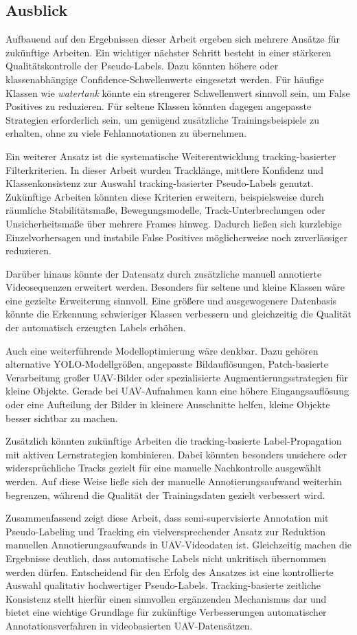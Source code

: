 \subsection{Ausblick}

Aufbauend auf den Ergebnissen dieser Arbeit ergeben sich mehrere Ansätze für
zukünftige Arbeiten. Ein wichtiger nächster Schritt besteht in einer stärkeren
Qualitätskontrolle der Pseudo-Labels. Dazu könnten höhere oder klassenabhängige
Confidence-Schwellenwerte eingesetzt werden. Für häufige Klassen wie
\textit{watertank} könnte ein strengerer Schwellenwert sinnvoll sein, um False
Positives zu reduzieren. Für seltene Klassen könnten dagegen angepasste Strategien
erforderlich sein, um genügend zusätzliche Trainingsbeispiele zu erhalten, ohne zu
viele Fehlannotationen zu übernehmen.

Ein weiterer Ansatz ist die systematische Weiterentwicklung tracking-basierter
Filterkriterien. In dieser Arbeit wurden Tracklänge, mittlere Konfidenz und
Klassenkonsistenz zur Auswahl tracking-basierter Pseudo-Labels genutzt. Zukünftige
Arbeiten könnten diese Kriterien erweitern, beispielsweise durch räumliche
Stabilitätsmaße, Bewegungsmodelle, Track-Unterbrechungen oder Unsicherheitsmaße
über mehrere Frames hinweg. Dadurch ließen sich kurzlebige Einzelvorhersagen
und instabile False Positives möglicherweise noch zuverlässiger reduzieren.

Darüber hinaus könnte der Datensatz durch zusätzliche manuell annotierte
Videosequenzen erweitert werden. Besonders für seltene und kleine Klassen wäre
eine gezielte Erweiterung sinnvoll. Eine größere und ausgewogenere Datenbasis
könnte die Erkennung schwieriger Klassen verbessern und gleichzeitig die Qualität
der automatisch erzeugten Labels erhöhen.

Auch eine weiterführende Modelloptimierung wäre denkbar. Dazu gehören
alternative YOLO-Modellgrößen, angepasste Bildauflösungen, Patch-basierte
Verarbeitung großer UAV-Bilder oder spezialisierte Augmentierungsstrategien für
kleine Objekte. Gerade bei UAV-Aufnahmen kann eine höhere Eingangsauflösung
oder eine Aufteilung der Bilder in kleinere Ausschnitte helfen, kleine Objekte
besser sichtbar zu machen.

Zusätzlich könnten zukünftige Arbeiten die tracking-basierte Label-Propagation
mit aktiven Lernstrategien kombinieren. Dabei könnten besonders unsichere oder
widersprüchliche Tracks gezielt für eine manuelle Nachkontrolle ausgewählt
werden. Auf diese Weise ließe sich der manuelle Annotierungsaufwand weiterhin
begrenzen, während die Qualität der Trainingsdaten gezielt verbessert wird.

Zusammenfassend zeigt diese Arbeit, dass semi-supervisierte Annotation mit
Pseudo-Labeling und Tracking ein vielversprechender Ansatz zur Reduktion
manuellen Annotierungsaufwands in UAV-Videodaten ist. Gleichzeitig machen die
Ergebnisse deutlich, dass automatische Labels nicht unkritisch übernommen werden
dürfen. Entscheidend für den Erfolg des Ansatzes ist eine kontrollierte Auswahl
qualitativ hochwertiger Pseudo-Labels. Tracking-basierte zeitliche Konsistenz
stellt hierfür einen sinnvollen ergänzenden Mechanismus dar und bietet eine
wichtige Grundlage für zukünftige Verbesserungen automatischer
Annotationsverfahren in videobasierten UAV-Datensätzen.